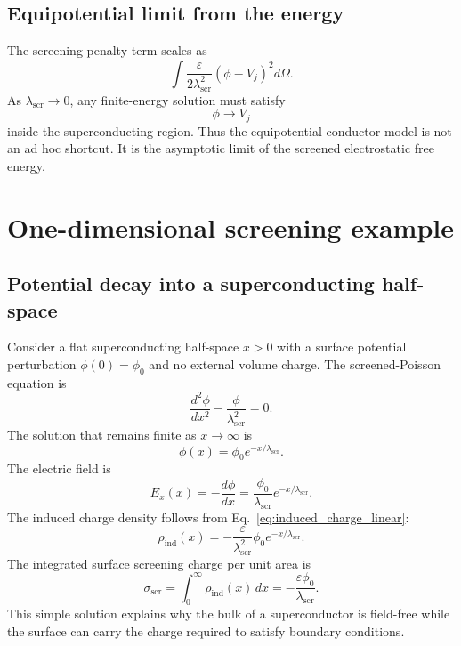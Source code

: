 \documentclass[11pt]{article}
\newcommand{\rhoind}{\rho_{\mathrm{ind}}}
\newcommand{\lams}{\lambda_{\mathrm{scr}}}
\begin{document}
\subsection{Equipotential limit from the energy}

The screening penalty term scales as
\begin{equation}
\int \frac{\varepsilon}{2\lams^2}(\phi-V_j)^2d\Omega.
\end{equation}
As $\lams\rightarrow 0$, any finite-energy solution must satisfy
\begin{equation}
\phi\rightarrow V_j
\end{equation}
inside the superconducting region. Thus the equipotential conductor model is not an ad hoc shortcut. It is the asymptotic limit of the screened electrostatic free energy.

\section{One-dimensional screening example}

\subsection{Potential decay into a superconducting half-space}

Consider a flat superconducting half-space $x>0$ with a surface potential perturbation $\phi(0)=\phi_0$ and no external volume charge. The screened-Poisson equation is
\begin{equation}
\frac{d^2\phi}{dx^2}-\frac{\phi}{\lams^2}=0.
\end{equation}
The solution that remains finite as $x\rightarrow\infty$ is
\begin{equation}
\phi(x)=\phi_0 e^{-x/\lams}.
\end{equation}
The electric field is
\begin{equation}
E_x(x)=-\frac{d\phi}{dx}=\frac{\phi_0}{\lams}e^{-x/\lams}.
\end{equation}
The induced charge density follows from Eq.~\eqref{eq:induced_charge_linear}:
\begin{equation}
\rhoind(x)=-\frac{\varepsilon}{\lams^2}\phi_0 e^{-x/\lams}.
\end{equation}
The integrated surface screening charge per unit area is
\begin{equation}
\sigma_{\mathrm{scr}}=\int_0^\infty \rhoind(x)\,dx
=-\frac{\varepsilon\phi_0}{\lams}.
\end{equation}
This simple solution explains why the bulk of a superconductor is field-free while the surface can carry the charge required to satisfy boundary conditions.
\end{document}
